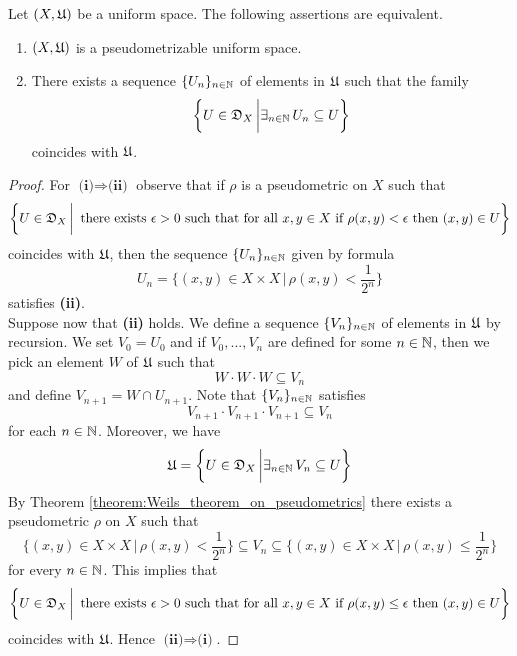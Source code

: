 \begin{theorem}\label{theorem:characterization_of_pseudometrizable_uniform_spaces}
Let $(X,{\mathfrak U})$ be a uniform space. The following assertions are equivalent.
\begin{enumerate}[label=\emph{\textbf{(\roman*)}}, leftmargin=*]
\item $(X,{\mathfrak U})$ is a pseudometrizable uniform space.
\item There exists a sequence $\{U_n\}_{n\in {\mathbb N}}$ of elements in ${\mathfrak U}$ such that the family
$$\bigg\{U\in {\mathfrak D}_{X}\,\bigg|\exists_{n\in {\mathbb N}}\,U_n \subseteq U\bigg\}$$
coincides with ${\mathfrak U}$.
\end{enumerate}
\end{theorem}
\begin{proof}
For $\textbf{(i)}\Rightarrow \textbf{(ii)}$ observe that if $\rho$ is a pseudometric on $X$ such that 
$$\bigg\{U \in {\mathfrak D}_{X}\,\bigg|\,\mbox{ there exists }\epsilon>0\mbox{ such that for all }x,y\in X\mbox{ if }\rho(x,y) < \epsilon\mbox{ then }(x,y)\in U\bigg\}$$
coincides with ${\mathfrak U}$, then the sequence $\{U_n\}_{n\in {\mathbb N}}$ given by formula
$$U_n = \bigg\{(x,y)\in X\times X\,\bigg|\,\rho(x,y) < \frac{1}{2^n}\bigg\}$$
satisfies \textbf{(ii)}.\\
Suppose now that \textbf{(ii)} holds. We define a sequence $\{V_n\}_{n\in {\mathbb N}}$ of elements in ${\mathfrak U}$ by recursion. We set $V_0 = U_0$ and if $V_0,...,V_n$ are defined for some $n\in {\mathbb N}$, then we pick an element $W$ of ${\mathfrak U}$ such that 
$$W\cdot W\cdot W \subseteq V_n$$
and define $V_{n+1} = W\cap U_{n+1}$. Note that $\{V_n\}_{n\in {\mathbb N}}$ satisfies
$$V_{n+1}\cdot V_{n+1}\cdot V_{n+1} \subseteq V_n$$
for each $n\in {\mathbb N}$. Moreover, we have
$${\mathfrak U} = \bigg\{U\in {\mathfrak D}_{X}\,\bigg|\exists_{n\in {\mathbb N}}\,V_n \subseteq U\bigg\}$$
By Theorem \ref{theorem:Weils_theorem_on_pseudometrics} there exists a pseudometric $\rho$ on $X$ such that
$$\bigg\{(x,y)\in X\times X\,\bigg|\,\rho(x,y)<\frac{1}{2^n}\bigg\} \subseteq V_n \subseteq \bigg\{(x,y)\in X\times X\,\bigg|\,\rho(x,y) \leq \frac{1}{2^n}\bigg\}$$
for every $n\in {\mathbb N}$. This implies that
$$\bigg\{U \in {\mathfrak D}_{X}\,\bigg|\,\mbox{ there exists }\epsilon>0\mbox{ such that for all }x,y\in X\mbox{ if }\rho(x,y)\leq \epsilon\mbox{ then }(x,y)\in U\bigg\}$$
coincides with ${\mathfrak U}$. Hence $\textbf{(ii)}\Rightarrow \textbf{(i)}$.
\end{proof}

